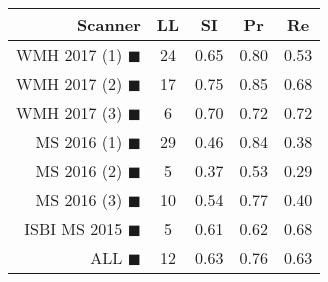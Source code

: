 \begin{tabular}{rcccc}
\toprule
Scanner & LL & SI & Pr & Re \\
\midrule
WMH 2017 (1) {\color[rgb]{ 1.00 0.00 0.00}$\blacksquare$} & 24 & 0.65 & 0.80 & 0.53 \\
WMH 2017 (2) {\color[rgb]{ 1.00 0.50 0.00}$\blacksquare$} & 17 & 0.75 & 0.85 & 0.68 \\
WMH 2017 (3) {\color[rgb]{ 1.00 0.80 0.00}$\blacksquare$} & 6 & 0.70 & 0.72 & 0.72 \\
MS  2016 (1) {\color[rgb]{ 0.20 0.80 0.00}$\blacksquare$} & 29 & 0.46 & 0.84 & 0.38 \\
MS  2016 (2) {\color[rgb]{ 0.00 0.40 1.00}$\blacksquare$} & 5 & 0.37 & 0.53 & 0.29 \\
MS  2016 (3) {\color[rgb]{ 0.60 0.00 1.00}$\blacksquare$} & 10 & 0.54 & 0.77 & 0.40 \\
ISBI MS 2015 {\color[rgb]{ 1.00 0.00 1.00}$\blacksquare$} & 5 & 0.61 & 0.62 & 0.68 \\
\midrule
ALL {\color[rgb]{ 1.00 1.00 1.00}$\blacksquare$} & 12 & 0.63 & 0.76 & 0.63 \\
\bottomrule
\end{tabular}